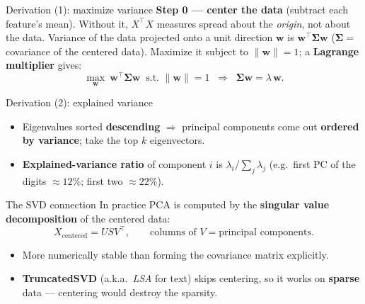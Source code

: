 \documentclass[aspectratio=169]{beamer}
\begin{document}
\begin{frame}{Derivation (1): maximize variance}
  \textbf{Step 0 --- center the data} (subtract each feature's mean). Without it, $X^\top X$ measures
  spread about the \emph{origin}, not about the data.
  \vfill
  Variance of the data projected onto a unit direction $\bm{w}$ is $\bm{w}^\top \bm{\Sigma}\bm{w}$
  ($\bm{\Sigma}=$ covariance of the centered data). Maximize it subject to $\|\bm{w}\|=1$; a
  \textbf{Lagrange multiplier} gives:
  \[
    \max_{\bm{w}} \ \bm{w}^\top\bm{\Sigma}\bm{w} \ \text{ s.t. } \|\bm{w}\|=1
    \;\;\Longrightarrow\;\; \bm{\Sigma}\bm{w} = \lambda\,\bm{w}.
  \]
  \vfill
\end{frame}

\begin{frame}{Derivation (2): explained variance}
  \begin{itemize}\small
    \item Eigenvalues sorted \textbf{descending} $\Rightarrow$ principal components come out
      \textbf{ordered by variance}; take the top $k$ eigenvectors.
    \item \textbf{Explained-variance ratio} of component $i$ is $\lambda_i / \sum_j \lambda_j$
      (e.g.\ first PC of the digits $\approx 12\%$; first two $\approx 22\%$).
  \end{itemize}
  \vfill
\end{frame}

\begin{frame}{The SVD connection}
  In practice PCA is computed by the \textbf{singular value decomposition} of the centered data:
  \[ X_{\text{centered}} = U S V^\top, \qquad \text{columns of } V = \text{principal components}. \]
  \begin{itemize}\small
    \item More numerically stable than forming the covariance matrix explicitly.
    \item \textbf{TruncatedSVD} (a.k.a.\ \emph{LSA} for text) skips centering, so it works on
      \textbf{sparse} data --- centering would destroy the sparsity.
  \end{itemize}
\end{frame}
\end{document}
